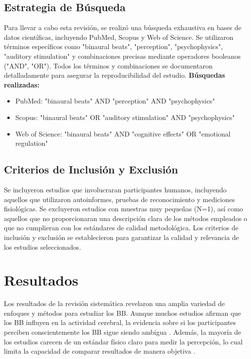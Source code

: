 \documentclass{article}
\begin{document}
\subsection{Estrategia de Búsqueda}
Para llevar a cabo esta revisión, se realizó una búsqueda exhaustiva en bases de datos científicas, incluyendo PubMed, Scopus y Web of Science. Se utilizaron términos específicos como "binaural beats", "perception", "psychophysics", "auditory stimulation" y combinaciones precisas mediante operadores booleanos ("AND", "OR"). Todos los términos y combinaciones se documentaron detalladamente para asegurar la reproducibilidad del estudio.\newline
\textbf{Búsquedas realizadas:}
\begin{itemize}
    \item PubMed: "binaural beats" AND "perception" AND "psychophysics"
    \item Scopus: "binaural beats" OR "auditory stimulation" AND "psychophysics"
    \item Web of Science: "binaural beats" AND "cognitive effects" OR "emotional regulation"
\end{itemize}


\subsection{Criterios de Inclusión y Exclusión}
Se incluyeron estudios que involucraran participantes humanos, incluyendo aquellos que utilizaron autoinformes, pruebas de reconocimiento y mediciones fisiológicas. Se excluyeron estudios con muestras muy pequeñas (N=1), así como aquellos que no proporcionaran una descripción clara de los métodos empleados o que no cumplieran con los estándares de calidad metodológica. Los criterios de inclusión y exclusión se establecieron para garantizar la calidad y relevancia de los estudios seleccionados.

\section{Resultados}
Los resultados de la revisión sistemática revelaron una amplia variedad de enfoques y métodos para estudiar los BB. Aunque muchos estudios afirman que los BB influyen en la actividad cerebral, la evidencia sobre si los participantes perciben conscientemente los BB sigue siendo ambigua \citep{lateralolive2023}. Además, la mayoría de los estudios carecen de un estándar físico claro para medir la percepción, lo cual limita la capacidad de comparar resultados de manera objetiva \citep{astrocytes2023}.
\end{document}
